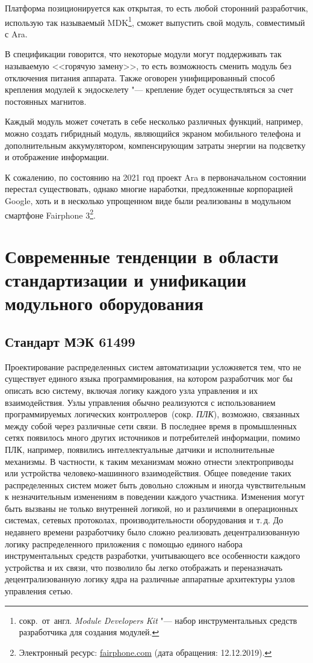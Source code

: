 Платформа позиционируется как открытая, то есть любой сторонний разработчик, использую так называемый MDK\footnote{сокр.~от~англ. \textit{Module Developers Kit} "--- набор инструментальных средств разработчика для создания модулей.}, сможет выпустить свой модуль, совместимый с Ara.

В спецификации говорится, что некоторые модули могут поддерживать так называемую <<горячую замену>>, то есть возможность сменить модуль без отключения питания аппарата. Также оговорен унифицированный способ крепления модулей к эндоскелету "--- крепление будет осуществляться за счет постоянных магнитов.

Каждый модуль может сочетать в себе несколько различных функций, например, можно создать гибридный модуль, являющийся экраном мобильного телефона и дополнительным аккумулятором, компенсирующим затраты энергии на подсветку и отображение информации.

К сожалению, по состоянию на 2021 год проект Ara в первоначальном состоянии перестал существовать, однако многие наработки, предложенные корпорацией Google, хоть и в несколько упрощенном виде были реализованы в модульном смартфоне Fairphone 3\footnote{Электронный ресурс: {\small\url{fairphone.com}} (дата обращения: 12.12.2019).}.

\section{Современные тенденции в области стандартизации и унификации модульного оборудования}

\subsection{Стандарт МЭК 61499}

Проектирование распределенных систем автоматизации усложняется тем, что не существует единого языка программирования, на котором разработчик мог бы описать всю систему, включая логику каждого узла управления и их взаимодействия. Узлы управления обычно реализуются с использованием программируемых логических контроллеров~(сокр. \textit{ПЛК}), возможно, связанных между собой через различные сети связи. В последнее время в промышленных сетях появилось много других источников и потребителей информации, помимо ПЛК, например, появились интеллектуальные датчики и исполнительные механизмы. В частности, к таким механизмам можно отнести электроприводы или устройства человеко-машинного взаимодействия. Общее поведение таких распределенных систем может быть довольно сложным и иногда чувствительным к незначительным изменениям в поведении каждого участника. Изменения могут быть вызваны не только внутренней логикой, но и различиями в операционных системах, сетевых протоколах, производительности оборудования и т.\,д. До недавнего времени разработчику было сложно реализовать децентрализованную логику распределенного приложения с помощью единого набора инструментальных средств разработки, учитывающего все особенности каждого устройства и их связи, что позволило бы легко отображать и переназначать децентрализованную логику ядра на различные аппаратные архитектуры узлов управления сетью.

